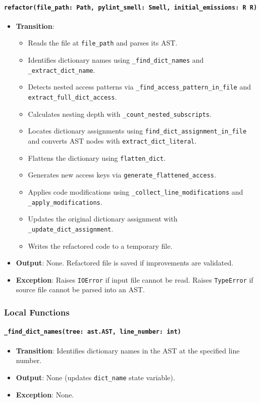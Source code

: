 \documentclass[12pt, titlepage]{article}
\begin{document}
\paragraph{\texttt{refactor(file\_path: Path, pylint\_smell: Smell, initial\_emissions: R R)}}
\begin{itemize}
\item \textbf{Transition}:
\begin{itemize}
\item Reads the file at \texttt{file\_path} and parses its AST.
\item Identifies dictionary names using \texttt{\_find\_dict\_names} and \texttt{\_extract\_dict\_name}.
\item Detects nested access patterns via \texttt{\_find\_access\_pattern\_in\_file} and \\ \texttt{extract\_full\_dict\_access}.
\item Calculates nesting depth with \texttt{\_count\_nested\_subscripts}.
\item Locates dictionary assignments using \texttt{find\_dict\_assignment\_in\_file} and converts AST nodes with \texttt{extract\_dict\_literal}.
\item Flattens the dictionary using \texttt{flatten\_dict}.
\item Generates new access keys via \texttt{generate\_flattened\_access}.
\item Applies code modifications using \texttt{\_collect\_line\_modifications} and \texttt{\_apply\_modifications}.
\item Updates the original dictionary assignment with \texttt{\_update\_dict\_assignment}.
\item Writes the refactored code to a temporary file.
\end{itemize}
\item \textbf{Output}: None. Refactored file is saved if improvements are validated.
\item \textbf{Exception}: Raises \texttt{IOError} if input file cannot be read. Raises \texttt{TypeError} if source file cannot be parsed into an AST.
\end{itemize}

\subsubsection{Local Functions}

\paragraph{\texttt{\_find\_dict\_names(tree: ast.AST, line\_number: int)}}
\begin{itemize}
\item \textbf{Transition}: Identifies dictionary names in the AST at the specified line number.
\item \textbf{Output}: None (updates \texttt{dict\_name} state variable).
\item \textbf{Exception}: None.
\end{itemize}
\end{document}
